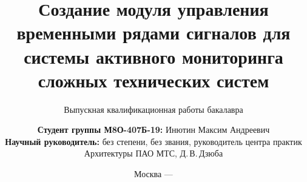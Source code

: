 \title{Создание модуля управления временными рядами сигналов для системы активного мониторинга сложных технических систем}
\subtitle{Выпускная квалификационная работы бакалавра}


\author[Инютин Максим Андреевич]
{
	\textbf{Студент группы М8О-407Б-19:} Инютин Максим Андреевич\\
	\textbf{Научный руководитель:} без степени, без звания, руководитель центра практик Архитектуры ПАО МТС, Д.\,В.\,Дзюба
}


\date{Москва --- \the\year}

